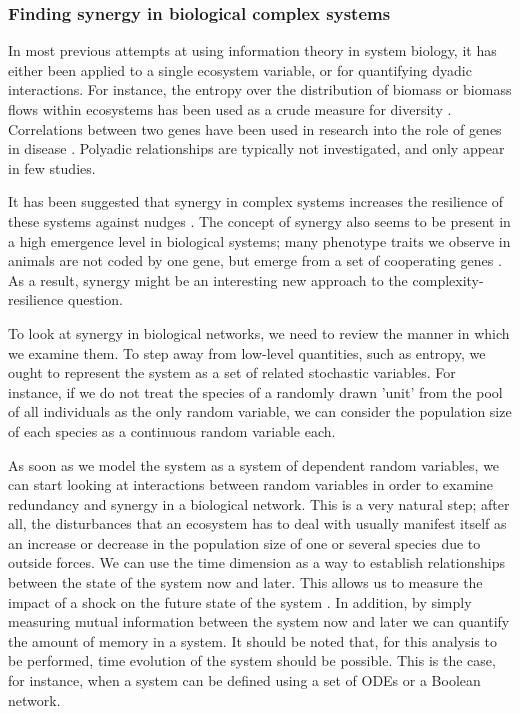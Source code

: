 \documentclass[../main.tex]{subfiles}
\begin{document}
\subsubsection{Finding synergy in biological complex systems}

In most previous attempts at using information theory in system biology, it has either been applied to a single ecosystem variable, or for quantifying dyadic interactions.
For instance, the entropy over the distribution of biomass or biomass flows within ecosystems has been used as a crude measure for diversity \cite{ulanowicz2009quantifying}.
Correlations between two genes have been used in research into the role of genes in disease \cite{lu2004gene}.
Polyadic relationships are typically not investigated, and only appear in few studies.

It has been suggested that synergy in complex systems increases the resilience of these systems against nudges \cite{quax2017quantifying}.
The concept of synergy also seems to be present in a high emergence level in biological systems; many phenotype traits we observe in animals are not coded by one gene, but emerge from a set of cooperating genes \cite{griffith2014quantifying}.
As a result, synergy might be an interesting new approach to the complexity-resilience question.

To look at synergy in biological networks, we need to review the manner in which we examine them.
To step away from low-level quantities, such as entropy, we ought to represent the system as a set of related stochastic variables.
For instance, if we do not treat the species of a randomly drawn 'unit' from the pool of all individuals as the only random variable, we can consider the population size of each species as a continuous random variable each.

As soon as we model the system as a system of dependent random variables, we can start looking at interactions between random variables in order to examine redundancy and synergy in a biological network.
This is a very natural step; after all, the disturbances that an ecosystem has to deal with usually manifest itself as an increase or decrease in the population size of one or several species due to outside forces.
We can use the time dimension as a way to establish relationships between the state of the system now and later.
This allows us to measure the impact of a shock on the future state of the system \cite{QuaxPersonal}.
In addition, by simply measuring mutual information between the system now and later we can quantify the amount of memory in a system.
It should be noted that, for this analysis to be performed, time evolution of the system should be possible.
This is the case, for instance, when a system can be defined using a set of ODEs or a Boolean network.
\end{document}
